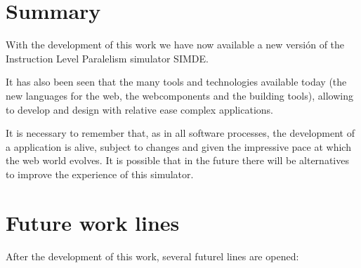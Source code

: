 
\section{Summary}
\label{8:sec:1}

With the development of this work we have now available a new versión of
the Instruction Level Paralelism simulator SIMDE.

\bigskip
It has also been seen that the many tools and technologies available today (the new languages 
for the web, the webcomponents and the building tools), allowing to develop 
and design with relative ease complex applications.

\bigskip
It is necessary to remember that, as in all software processes, the development of a
application is alive, subject to changes and given the impressive pace at which the web world evolves.
It is possible that in the future there will be alternatives to improve the experience of this simulator.

\section{Future work lines}
\label{8:sec:2}

After the development of this work, several futurel lines are opened: 

